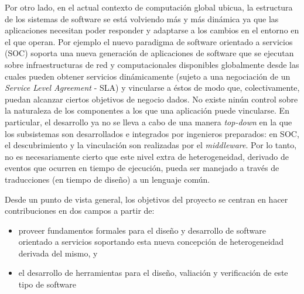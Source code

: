 \documentclass[a4paper, 11pt]{article}
\begin{document}
  Por otro lado, en el actual contexto de computación global ubicua, la estructura de los sistemas de software se está volviendo más y más dinámica ya que las aplicaciones necesitan poder responder y adaptarse a los cambios en el entorno en el que operan. Por ejemplo el nuevo paradigma de software orientado a servicios (SOC) soporta una nueva generación de aplicaciones de software que se ejecutan  sobre infraestructuras de red y computacionales disponibles globalmente desde las cuales pueden obtener servicios dinámicamente (sujeto a una negociación de un \emph{Service Level Agreement} - SLA) y vincularse a éstos de modo que, colectivamente, puedan alcanzar ciertos objetivos de negocio dados. No existe ninún control sobre la naturaleza de los componentes a los que una aplicación puede vincularse. En particular, el desarrollo ya no se lleva a cabo de una manera \emph{top-down} en la que los subsistemas son desarrollados e integrados por ingenieros preparados: en SOC, el descubrimiento y la vinculación son realizadas por el \emph{middleware}. Por lo tanto, no es necesariamente cierto que este nivel extra de heterogeneidad, derivado de eventos que ocurren en tiempo de ejecución, pueda ser manejado a través de traducciones (en tiempo de diseño) a un lenguaje común. 
  
  Desde un punto de vista general, los objetivos del proyecto se centran en hacer contribuciones en dos campos a partir de:
  \begin{itemize}
   \item proveer fundamentos formales para el diseño y desarrollo de software orientado a servicios soportando esta nueva concepción de heterogeneidad derivada del mismo, y
   \item el desarrollo de herramientas para el diseño, valiación y verificación de este tipo de software
  \end{itemize}
\end{document}
